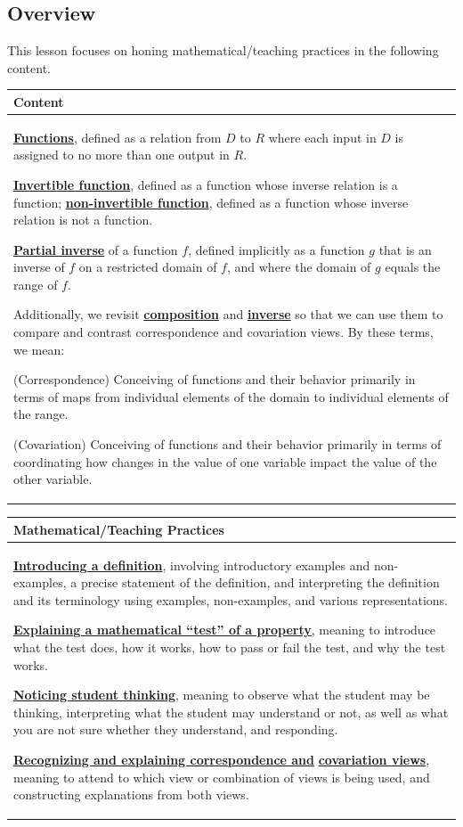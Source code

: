 \documentclass[11pt]{article}
\renewcommand\emph[1]{\underline{\bf{#1}}} %
\theoremstyle{definition}
\begin{document}
\vspace*{-8pt}\subsection{Overview}

\vspace*{-8pt}
This lesson focuses on honing mathematical/teaching practices in the following content.

\vspace*{-4pt}
\begin{tabular}{L{6.5in}} 
{\bf Content} \\ \hline \parskip4pt
\emph{Functions}, defined as a relation from $D$ to $R$ where each input in $D$ is assigned to no more than one output in $R$.

\emph{Invertible function}, defined as a function whose inverse relation is a function; \emph{non-invertible function}, defined as a function whose inverse relation is not a function.

\emph{Partial inverse} of a function $f$, defined implicitly as a function $g$ that is an inverse of $f$ on a restricted domain of $f$, and where the domain of $g$ equals the range of $f$.

Additionally, we revisit \emph{composition} and \emph{inverse} so that we can use them to compare and contrast correspondence and covariation views. By these terms, we mean:
	\begin{itemize*}
	\item %
	(Correspondence) Conceiving of functions and their behavior primarily in terms of maps from individual elements of the domain to individual elements of the range. 
	\item %
	(Covariation) Conceiving of functions and their behavior primarily in terms of coordinating how changes in the value of one variable impact the value of the other variable.
	\end{itemize*} 
\end{tabular} 


\vspace*{-12pt}
\begin{tabular}{L{6.5in}} 
{\bf Mathematical/Teaching Practices} \\ \hline \parskip4pt
\emph{Introducing a definition}, involving introductory examples and non-examples, a precise statement of the definition, and interpreting the definition and its terminology using examples, non-examples, and various representations. 

\emph{Explaining a mathematical ``test'' of a property}, meaning to introduce what the test does, how it works, how to pass or fail the test, and why the test works.

\emph{Noticing student thinking}, meaning to observe what the student may be thinking, interpreting what the student may understand or not, as well as what you are not sure whether they understand, and responding.

\emph{Recognizing and explaining correspondence and} \emph{covariation views}, meaning to attend to which view or combination of views is being used, and constructing explanations from both views. 
\end{tabular}
\end{document}
